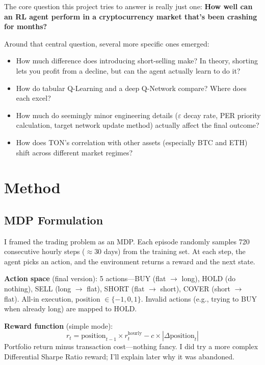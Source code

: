 \documentclass[11pt,a4paper]{article}
\begin{document}
The core question this project tries to answer is really just one: \textbf{How well can an RL agent perform in a cryptocurrency market that's been crashing for months?}

Around that central question, several more specific ones emerged:

\begin{itemize}[nosep]
    \item How much difference does introducing short-selling make? In theory, shorting lets you profit from a decline, but can the agent actually learn to do it?
    \item How do tabular Q-Learning and a deep Q-Network compare? Where does each excel?
    \item How much do seemingly minor engineering details ($\varepsilon$ decay rate, PER priority calculation, target network update method) actually affect the final outcome?
    \item How does TON's correlation with other assets (especially BTC and ETH) shift across different market regimes?
\end{itemize}

\section{Method}

\subsection{MDP Formulation}

I framed the trading problem as an MDP. Each episode randomly samples 720 consecutive hourly steps ($\approx$30 days) from the training set. At each step, the agent picks an action, and the environment returns a reward and the next state.

\textbf{Action space} (final version): 5 actions---BUY (flat $\to$ long), HOLD (do nothing), SELL (long $\to$ flat), SHORT (flat $\to$ short), COVER (short $\to$ flat). All-in execution, position $\in \{-1, 0, 1\}$. Invalid actions (e.g., trying to BUY when already long) are mapped to HOLD.

\textbf{Reward function} (simple mode):
\[
    r_t = \text{position}_{t-1} \times r^{\text{hourly}}_t - c \times |\Delta\text{position}_t|
\]
Portfolio return minus transaction cost---nothing fancy. I did try a more complex Differential Sharpe Ratio reward; I'll explain later why it was abandoned.
\end{document}
